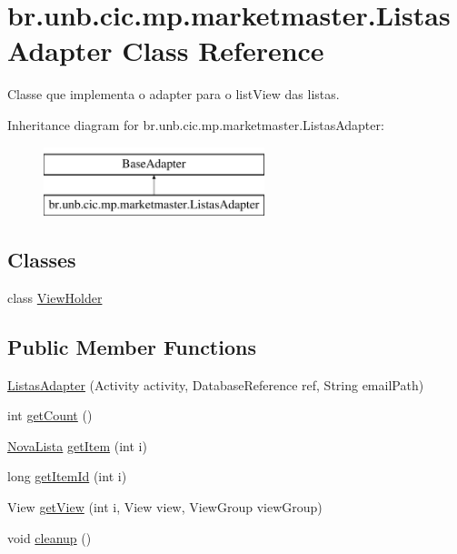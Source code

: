 \hypertarget{classbr_1_1unb_1_1cic_1_1mp_1_1marketmaster_1_1ListasAdapter}{}\section{br.\+unb.\+cic.\+mp.\+marketmaster.\+Listas\+Adapter Class Reference}
\label{classbr_1_1unb_1_1cic_1_1mp_1_1marketmaster_1_1ListasAdapter}


Classe que implementa o adapter para o list\+View das listas.  


Inheritance diagram for br.\+unb.\+cic.\+mp.\+marketmaster.\+Listas\+Adapter\+:\begin{figure}[H]
\begin{center}
\leavevmode
\includegraphics[height=2.000000cm]{classbr_1_1unb_1_1cic_1_1mp_1_1marketmaster_1_1ListasAdapter}
\end{center}
\end{figure}
\subsection*{Classes}
\begin{DoxyCompactItemize}
\item 
class \mbox{\hyperlink{classbr_1_1unb_1_1cic_1_1mp_1_1marketmaster_1_1ListasAdapter_1_1ViewHolder}{View\+Holder}}
\end{DoxyCompactItemize}
\subsection*{Public Member Functions}
\begin{DoxyCompactItemize}
\item 
\mbox{\hyperlink{classbr_1_1unb_1_1cic_1_1mp_1_1marketmaster_1_1ListasAdapter_aefea99ae267922406c46fea440d4686c}{Listas\+Adapter}} (Activity activity, Database\+Reference ref, String email\+Path)
\item 
int \mbox{\hyperlink{classbr_1_1unb_1_1cic_1_1mp_1_1marketmaster_1_1ListasAdapter_a1901a9010e0424f505a1ee66500fbd04}{get\+Count}} ()
\item 
\mbox{\hyperlink{classbr_1_1unb_1_1cic_1_1mp_1_1marketmaster_1_1NovaLista}{Nova\+Lista}} \mbox{\hyperlink{classbr_1_1unb_1_1cic_1_1mp_1_1marketmaster_1_1ListasAdapter_ad4ead0d7de6a69ae1b35ae6525ed92df}{get\+Item}} (int i)
\item 
long \mbox{\hyperlink{classbr_1_1unb_1_1cic_1_1mp_1_1marketmaster_1_1ListasAdapter_a456a76c23cd199ae43e768288476508f}{get\+Item\+Id}} (int i)
\item 
View \mbox{\hyperlink{classbr_1_1unb_1_1cic_1_1mp_1_1marketmaster_1_1ListasAdapter_a02102eec45f703cd8bba2dcc7741ed9d}{get\+View}} (int i, View view, View\+Group view\+Group)
\item 
void \mbox{\hyperlink{classbr_1_1unb_1_1cic_1_1mp_1_1marketmaster_1_1ListasAdapter_a89209e252e631d5990bfe552aacc5af0}{cleanup}} ()
\end{DoxyCompactItemize}
